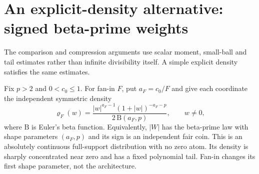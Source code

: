 \section{An explicit-density alternative: signed beta-prime weights}
\label{sec:beta-prime}
The comparison and compression arguments use scalar moment, small-ball and tail estimates rather than infinite divisibility itself. A simple explicit density satisfies the same estimates.

Fix $p>2$ and $0<c_0\le1$. For fan-in $F$, put $a_F=c_0/F$ and give each coordinate the independent symmetric density
\begin{equation}
 \varrho_F(w)=
 \frac{|w|^{a_F-1}(1+|w|)^{-a_F-p}}
      {2\,\mathrm B(a_F,p)},\qquad w\ne0,
 \label{eq:beta-prime-prior}
\end{equation}
where $\mathrm B$ is Euler's beta function. Equivalently, $|W|$ has the beta-prime law with shape parameters $(a_F,p)$ and its sign is an independent fair coin. This is an absolutely continuous full-support distribution with no zero atom. Its density is sharply concentrated near zero and has a fixed polynomial tail. Fan-in changes its first shape parameter, not the architecture.

